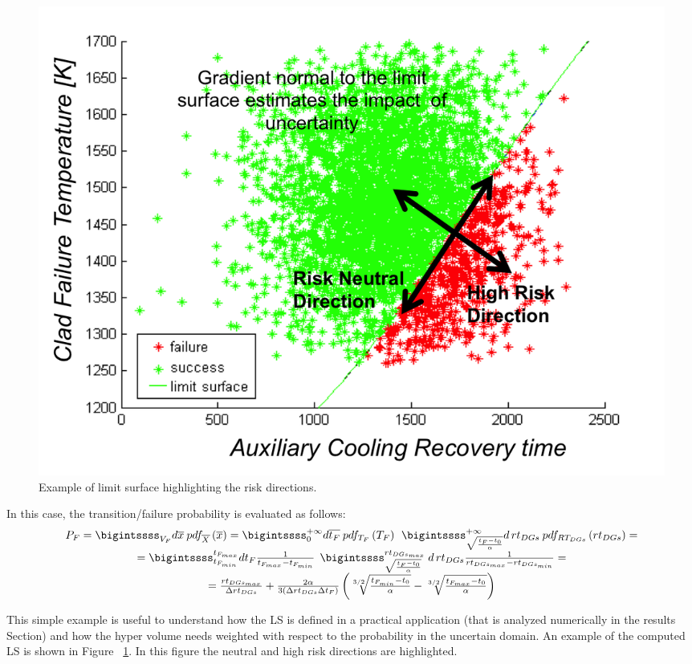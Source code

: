 \begin{figure}[h!]
  \centering
  \includegraphics[width=1.0\textwidth]  {pics/ExampleLSwitRiskDirections.png}
  \caption{Example of limit surface highlighting the risk directions.}
  \label{fig:ExampleLSwitRiskDirections}
\end{figure}
In this case, the transition/failure probability is evaluated as follows:
\begin{equation}
\begin{matrix}
P_{F} = \bigintssss_{V_{F}}d\overline{x}\: pdf_{\overline{X}}\left ( \overline{x} \right )
= \bigintssss_{0}^{+\infty }d\overline{t_{F}}\: pdf_{T_{F}}\left ( T_{F} \right )\: \: \bigintssss_{\sqrt{\frac{t_{F}-t_{0}}{\alpha}}}^{+\infty } d\, rt_{DGs} \: pdf_{RT_{DGs}}\left ( rt_{DGs} \right )  =
\\
= \bigintssss_{t_{F_{min}}}^{t_{F_{max}}} dt_{F}\frac{1}{t_{F_{max}}-t_{F_{min}}}\: \: \bigintssss_{\sqrt{\frac{t_{F}-t_{0}}{\alpha}}}^{ rt_{DGs_{max}}}\: d\, rt_{DGs} \frac{1}{rt_{DGs_{max}}-rt_{DGs_{min}}} =
\\
= \frac{rt_{DGs_{max}}}{\Delta rt_{DGs}} + \frac{2\alpha}{3\left ( \Delta rt_{DGs}\Delta t_{F} \right )}
\left ( \sqrt[3/2]{\frac{t_{F_{min}}-t_{0}}{\alpha}} - \sqrt[3/2]{\frac{t_{F_{max}}-t_{0}}{\alpha}} \right )
\end{matrix}
\end{equation}

This simple example is useful to understand how the LS is defined in a practical application (that is analyzed numerically in the results Section) and how the hyper volume needs weighted with respect to the probability in the uncertain domain. An example of the computed LS is shown in Figure ~\ref{fig:ExampleLSwitRiskDirections}.
In this figure the neutral and high risk directions are highlighted.

